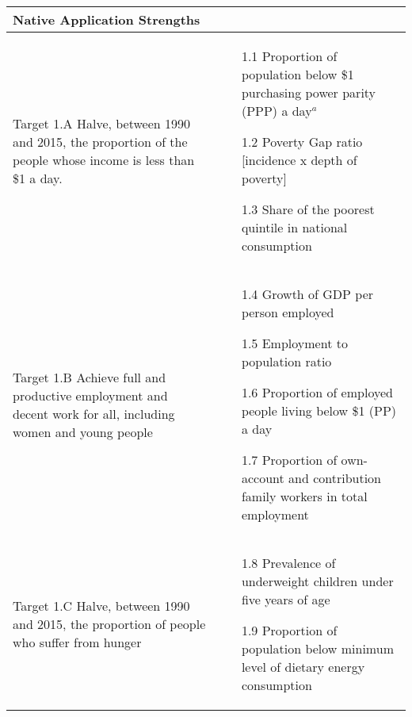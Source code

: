 \begin{center}
\begin{tabularx}{\textwidth}[t]{XX}
\arrayrulecolor{green}\hline
\textbf{\textcolor{myGreen}{Native Application Strengths}} & \\
\hline
Target 1.A Halve, between 1990 and 2015, the proportion of the people whose income is less than \$1 a day. & 
\begin{minipage}[t]{\linewidth}%
\begin{itemize}
\item[1.1] Proportion of population below \$1 purchasing power parity (PPP) a day$^a$
\item[1.2] Poverty Gap ratio [incidence x depth of poverty]
\item[1.3] Share of the poorest quintile in national consumption
\end{itemize} 
\end{minipage}\\

\arrayrulecolor{black}\hline

Target 1.B Achieve full and productive employment and decent work for all, including women and young people &
\begin{minipage}[t]{\linewidth}%
\begin{itemize}
\item[1.4] Growth of GDP per person employed 
\item[1.5] Employment to population ratio
\item[1.6] Proportion of employed people living below \$1 (PP) a day
\item[1.7] Proportion of own-account and contribution family workers in total employment
\end{itemize} 
\end{minipage}\\

\hline

Target 1.C Halve, between 1990 and 2015, the proportion of people who suffer from hunger &
\begin{minipage}[t]{\linewidth}%
\begin{itemize}
\item[1.8] Prevalence of underweight children under five years of age
\item[1.9] Proportion of population below minimum level of dietary energy consumption
\end{itemize}
\end{minipage}\\


\end{tabularx}
\end{center}

